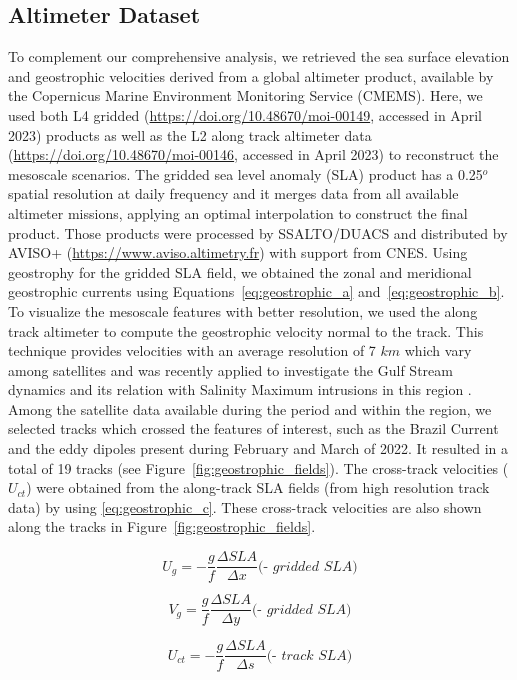 \documentclass[draft]{agujournal2019}
\begin{document}
\subsection{Altimeter Dataset}
To complement our comprehensive analysis, we retrieved the sea surface elevation and geostrophic velocities derived from a global altimeter product, available by the Copernicus Marine Environment Monitoring Service (CMEMS). Here, we used both L4 gridded (\url{https://doi.org/10.48670/moi-00149}, accessed in April 2023) products as well as the L2 along track altimeter data (\url{https://doi.org/10.48670/moi-00146}, accessed in April 2023) to reconstruct the mesoscale scenarios. The gridded sea level anomaly (SLA) product has a 0.25$^o$ spatial resolution at daily frequency and it merges data from all available altimeter missions, applying an optimal interpolation to construct the final product. Those products were processed by SSALTO/DUACS and distributed by AVISO+ (\url{https://www.aviso.altimetry.fr}) with support from CNES. Using geostrophy for the gridded SLA field, we obtained the zonal and meridional geostrophic currents using Equations~\ref{eq:geostrophic_a} and~\ref{eq:geostrophic_b}.  To visualize the mesoscale features with better resolution, we used the along track altimeter to compute the geostrophic velocity normal to the track. This technique provides velocities with an average resolution of 7 $km$ which vary among satellites and was recently applied to investigate the Gulf Stream dynamics and its relation with Salinity Maximum intrusions in this region \cite{silver2023increased}. Among the satellite data available during the period and within the region, we selected tracks which crossed the features of interest, such as the Brazil Current and the eddy dipoles present during February and March of 2022. It resulted in a total of 19 tracks (see Figure~\ref{fig:geostrophic_fields}). The cross-track velocities ($U_{ct}$) were obtained from the along-track SLA fields (from high resolution track data) by using \ref{eq:geostrophic_c}. These cross-track velocities are also shown along the tracks in Figure~\ref{fig:geostrophic_fields}. 

\begin{linenomath*}

\begin{equation}
\label{eq:geostrophic_a}
U_{g}  = - \frac{g}{f} \frac{\Delta{SLA}}{\Delta x} {\textit{(- gridded SLA)}}
\end{equation}

\begin{equation}
\label{eq:geostrophic_b}
V_{g}  = \frac{g}{f} \frac{\Delta{SLA}}{\Delta y} {\textit{(- gridded SLA)}}
\end{equation}

\begin{equation}
\label{eq:geostrophic_c}
U_{ct}  = - \frac{g}{f} \frac{\Delta{SLA}}{\Delta s} {\textit{(- track SLA)}}
\end{equation}
\end{linenomath*}
\end{document}

